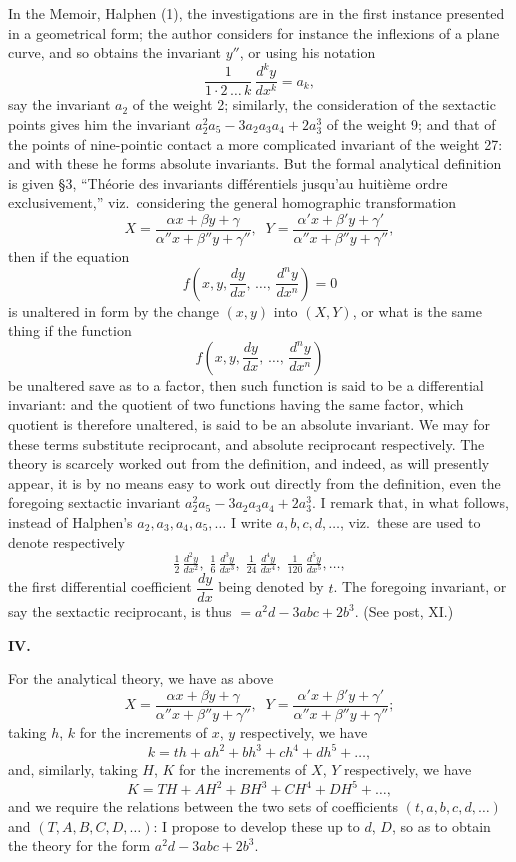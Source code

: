 \documentclass[11pt]{article}
\begin{document}
In the Memoir, Halphen (1), the investigations are in the first instance presented in a geometrical form; the author considers for instance the inflexions of a plane curve, and so obtains the invariant $y''$, or using his notation
\[ \frac{1}{1\cdot 2\,\ldots\,k}\,\frac{d^ky}{dx^k} = a_k, \]
say the invariant $a_2$ of the weight 2; similarly, the consideration of the sextactic points gives him the invariant $a_2^2 a_5 - 3a_2 a_3 a_4 + 2a_3^3$ of the weight 9; and that of the points of nine-pointic contact a more complicated invariant of the weight 27: and with these he forms absolute invariants. But the formal analytical definition is given \S 3, ``Th\'eorie des invariants diff\'erentiels jusqu'au huiti\`eme ordre exclusivement,'' viz.\ considering the general homographic transformation
\[ X = \frac{\alpha x + \beta y + \gamma}{\alpha''x + \beta''y + \gamma''},\;\; Y = \frac{\alpha'x + \beta'y + \gamma'}{\alpha''x + \beta''y + \gamma''}, \]
then if the equation
\[ f\!\left(x, y, \frac{dy}{dx},\,\ldots,\,\frac{d^ny}{dx^n}\right) = 0 \]
is unaltered in form by the change $(x, y)$ into $(X, Y)$, or what is the same thing if the function
\[ f\!\left(x, y, \frac{dy}{dx},\,\ldots,\,\frac{d^ny}{dx^n}\right) \]
be unaltered save as to a factor, then such function is said to be a differential invariant: and the quotient of two functions having the same factor, which quotient is therefore unaltered, is said to be an absolute invariant. We may for these terms substitute reciprocant, and absolute reciprocant respectively. The theory is scarcely worked out from the definition, and indeed, as will presently appear, it is by no means easy to work out directly from the definition, even the foregoing sextactic invariant $a_2^2 a_5 - 3a_2 a_3 a_4 + 2a_3^3$. I remark that, in what follows, instead of Halphen's $a_2, a_3, a_4, a_5,\ldots$ I write $a, b, c, d, \ldots$, viz.\ these are used to denote respectively
\[ \tfrac{1}{2}\,\tfrac{d^2y}{dx^2},\;\tfrac{1}{6}\,\tfrac{d^3y}{dx^3},\;\tfrac{1}{24}\,\tfrac{d^4y}{dx^4},\;\tfrac{1}{120}\,\tfrac{d^5y}{dx^5},\ldots, \]
the first differential coefficient $\dfrac{dy}{dx}$ being denoted by $t$. The foregoing invariant, or say the sextactic reciprocant, is thus $= a^2d - 3abc + 2b^3$. (See post, XI.)

\medskip
\textbf{IV.}

For the analytical theory, we have as above
\[ X = \frac{\alpha x + \beta y + \gamma}{\alpha''x + \beta''y + \gamma''},\;\; Y = \frac{\alpha'x + \beta'y + \gamma'}{\alpha''x + \beta''y + \gamma''}; \]
taking $h$, $k$ for the increments of $x$, $y$ respectively, we have
\[ k = th + ah^2 + bh^3 + ch^4 + dh^5 + \ldots, \]
and, similarly, taking $H$, $K$ for the increments of $X$, $Y$ respectively, we have
\[ K = TH + AH^2 + BH^3 + CH^4 + DH^5 + \ldots, \]
and we require the relations between the two sets of coefficients $(t, a, b, c, d, \ldots)$ and $(T, A, B, C, D, \ldots)$: I propose to develop these up to $d$, $D$, so as to obtain the theory for the form $a^2d - 3abc + 2b^3$.
\end{document}
